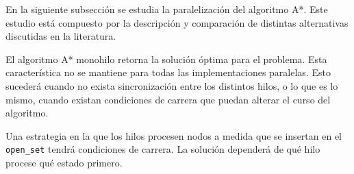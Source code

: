 En la siguiente subsección
se estudia la paralelización
del algoritmo A*.
Este estudio está compuesto por la descripción y
comparación de distintas alternativas discutidas en
la literatura.

El algoritmo A* monohilo retorna la solución óptima
para el problema.
Esta característica no se mantiene para todas las
implementaciones paralelas.
Esto sucederá cuando no exista sincronización
entre los distintos hilos,
o lo que es lo mismo,
cuando existan condiciones de carrera
que puedan alterar el curso del algoritmo.

\begin{examplebox}
    Una estrategia en la que los hilos procesen nodos
    a medida que se insertan en el \lstinline{open_set}
    tendrá condiciones de carrera.
    La solución dependerá de qué hilo procese qué estado
    primero.
\end{examplebox}







    



